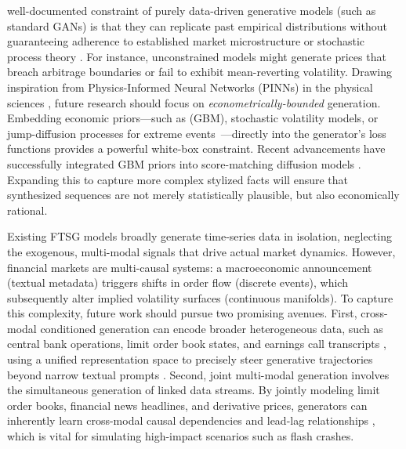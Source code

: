 well-documented constraint of purely data-driven generative models (such as standard GANs) is that they can replicate past empirical distributions without guaranteeing adherence to established market microstructure or stochastic process theory \citep{cont2001empirical}. For instance, unconstrained models might generate prices that breach arbitrage boundaries or fail to exhibit mean-reverting volatility.
Drawing inspiration from Physics-Informed Neural Networks (PINNs) in the physical sciences \citep{raissi2019physics}, future research should focus on \textit{econometrically-bounded} generation. Embedding economic priors---such as (GBM), stochastic volatility models, or jump-diffusion processes for extreme events~\citep{merton1976option}---directly into the generator's loss functions provides a powerful white-box constraint. Recent advancements have successfully integrated GBM priors into score-matching diffusion models \citep{tanaka2025cofindiff}. Expanding this to capture more complex stylized facts will ensure that synthesized sequences are not merely statistically plausible, but also economically rational.

Existing FTSG models broadly generate time-series data in isolation, neglecting the exogenous, multi-modal signals that drive actual market dynamics. However, financial markets are multi-causal systems: a macroeconomic announcement (textual metadata) triggers shifts in order flow (discrete events), which subsequently alter implied volatility surfaces (continuous manifolds). To capture this complexity, future work should pursue two promising avenues. First, cross-modal conditioned generation can encode broader heterogeneous data, such as central bank operations, limit order book states, and earnings call transcripts \cite{gholamrezaei2023conditioning, T2S, lozano2023dual}, using a unified representation space to precisely steer generative trajectories beyond narrow textual prompts \cite{Time-LLM, liu2025calf}. Second, joint multi-modal generation involves the simultaneous generation of linked data streams. By jointly modeling limit order books, financial news headlines, and derivative prices, generators can inherently learn cross-modal causal dependencies and lead-lag relationships \cite{lozano2023dual}, which is vital for simulating high-impact scenarios such as flash crashes.

